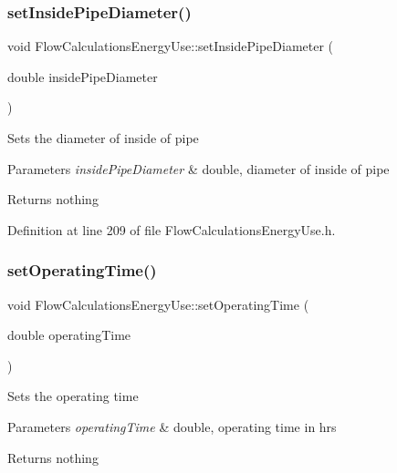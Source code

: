 \subsubsection{\texorpdfstring{set\+Inside\+Pipe\+Diameter()}{setInsidePipeDiameter()}\hspace{0.1cm}{\footnotesize\ttfamily [3/3]}}
{\footnotesize\ttfamily void Flow\+Calculations\+Energy\+Use\+::set\+Inside\+Pipe\+Diameter (\begin{DoxyParamCaption}\item[{double}]{inside\+Pipe\+Diameter }\end{DoxyParamCaption})\hspace{0.3cm}{\ttfamily [inline]}}

Sets the diameter of inside of pipe


\begin{DoxyParams}{Parameters}
{\em inside\+Pipe\+Diameter} & double, diameter of inside of pipe\\
\hline
\end{DoxyParams}
\begin{DoxyReturn}{Returns}
nothing 
\end{DoxyReturn}


Definition at line 209 of file Flow\+Calculations\+Energy\+Use.\+h.

\mbox{\label{class_flow_calculations_energy_use_ac82800d533502c7836238dcab1f39fac}} 
\subsubsection{\texorpdfstring{set\+Operating\+Time()}{setOperatingTime()}\hspace{0.1cm}{\footnotesize\ttfamily [1/3]}}
{\footnotesize\ttfamily void Flow\+Calculations\+Energy\+Use\+::set\+Operating\+Time (\begin{DoxyParamCaption}\item[{double}]{operating\+Time }\end{DoxyParamCaption})\hspace{0.3cm}{\ttfamily [inline]}}

Sets the operating time


\begin{DoxyParams}{Parameters}
{\em operating\+Time} & double, operating time in hrs\\
\hline
\end{DoxyParams}
\begin{DoxyReturn}{Returns}
nothing 
\end{DoxyReturn}


